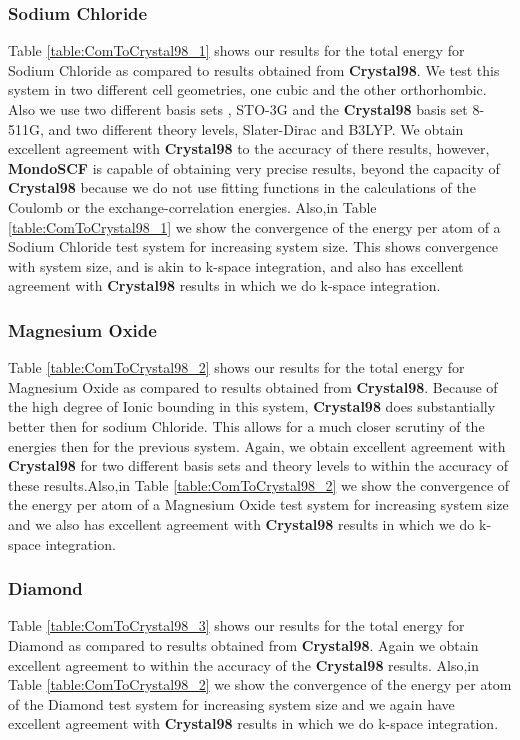 \documentclass[prb,aps,nobibnotes,twocolumn,doublespace,twocolumngrid,superbib]{revtex4}
\begin{document}
\subsubsection{Sodium Chloride}

Table \ref{table:ComToCrystal98_1} shows our results for the total
energy for Sodium Chloride as compared to results obtained from \textbf{Crystal98}.
We test this system in two different cell geometries, one cubic and
the other orthorhombic. Also we use two different basis sets , STO-3G
and the \textbf{Crystal98} basis set 8-511G, and two different theory levels, 
Slater-Dirac and B3LYP. We obtain excellent agreement with \textbf{Crystal98} to the accuracy
of there results, however, \textbf{MondoSCF} is capable of obtaining
very precise results, beyond the capacity of \textbf{Crystal98} because
we do not use fitting functions in the calculations of the Coulomb
or the exchange-correlation energies. Also,in Table \ref{table:ComToCrystal98_1}
we show the convergence of the energy per atom of a Sodium Chloride
test system for increasing system size. This shows convergence with
system size, and is akin to k-space integration, and also has excellent agreement
with \textbf{Crystal98} results in which we do k-space integration. 


\subsubsection{Magnesium Oxide}

Table \ref{table:ComToCrystal98_2} shows our results for the total
energy for Magnesium Oxide as compared to results obtained from \textbf{Crystal98}.
Because of the high degree of Ionic bounding in this system, \textbf{Crystal98}
does substantially better then for sodium Chloride. This allows for
a much closer scrutiny of the energies then for the previous system.
Again, we obtain excellent agreement with \textbf{Crystal98} for two
different basis sets and theory levels to within the accuracy of these
results.Also,in Table \ref{table:ComToCrystal98_2}
we show the convergence of the energy per atom of a Magnesium Oxide
test system for increasing system size and we also has excellent agreement
with \textbf{Crystal98} results in which we do k-space integration.


\subsubsection{Diamond}

Table \ref{table:ComToCrystal98_3} shows our results for the total
energy for Diamond as compared to results obtained from \textbf{Crystal98}.
Again we obtain excellent agreement to within the accuracy of the
\textbf{Crystal98} results.
Also,in Table \ref{table:ComToCrystal98_2}
we show the convergence of the energy per atom of the Diamond
test system for increasing system size and we again have excellent agreement
with \textbf{Crystal98} results in which we do k-space integration.
\end{document}

